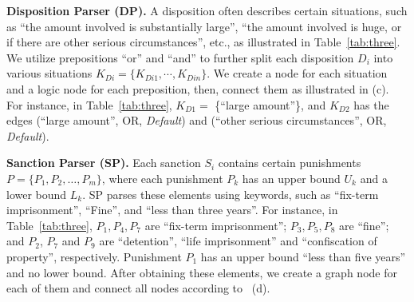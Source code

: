 \textbf{Disposition Parser (DP).} 
A disposition often describes certain situations, such as ``the amount involved is substantially large'', ``the amount involved is huge, or if there are other serious circumstances'', etc., as illustrated in Table~\ref{tab:three}. We utilize prepositions ``or'' and ``and'' to further split each disposition $D_i$ into various situations $K_{Di} = \{K_{Di1}, \cdots, K_{Din} \}$. We create a node for each situation and a logic node for each preposition, then, connect them as illustrated in  (c). For instance, in Table~\ref{tab:three}, $K_{D1} = $ \{``large amount''\}, and $K_{D2}$ has the edges (``large amount'', OR, \emph{Default}) and (``other serious circumstances'', OR, \emph{Default}). 



\textbf{Sanction Parser (SP).} 
Each sanction $S_i$ contains certain punishments $P = \{P_1, P_2, \ldots, P_m \}$, where each punishment $P_k$ has an upper bound $U_k$ and a lower bound $L_k$. SP parses these elements using keywords, such as ``fix-term imprisonment'', ``Fine'', and ``less than three years''. For instance, in Table~\ref{tab:three}, $P_1, P_4, P_7$ are ``fix-term imprisonment''; $P_3, P_5, P_8$ are ``fine''; and $P_2$, $P_7$ and $P_9$ are ``detention'', ``life imprisonment'' and ``confiscation of property'', respectively. Punishment $P_1$ has an upper bound ``less than five years'' and no lower bound. After obtaining these elements, we create a graph node for each of them and connect all nodes according to ~(d). 

